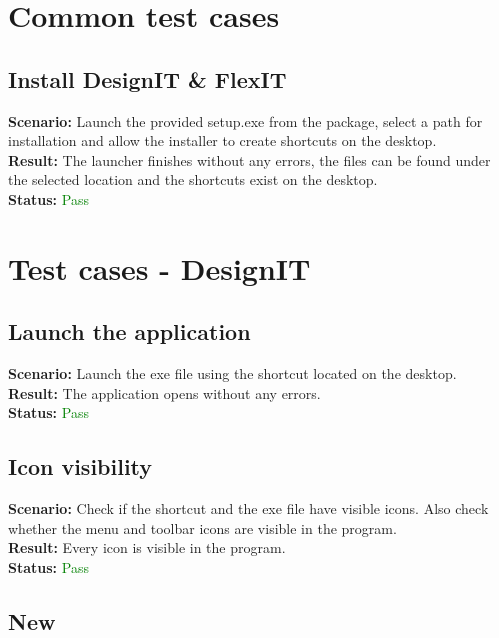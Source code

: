 \documentclass[a4paper, 11pt, article]{report}
\begin{document}
\section{Common test cases}

\subsection{Install DesignIT \& FlexIT}

\noindent \textbf{Scenario:} Launch the provided setup.exe from the package, select a path for installation and allow the installer to create shortcuts on the desktop.
\\
\noindent \textbf{Result:} The launcher finishes without any errors, the files can be found under the selected location and the shortcuts exist on the desktop.
\\
\noindent \textbf{Status:} \textcolor{green}{Pass}

\section{Test cases - DesignIT}

\subsection{Launch the application}

\noindent \textbf{Scenario:} Launch the exe file using the shortcut located on the desktop.
\\
\noindent \textbf{Result:} The application opens without any errors.
\\
\noindent \textbf{Status:} \textcolor{green}{Pass}

\subsection{Icon visibility}

\noindent \textbf{Scenario:} Check if the shortcut and the exe file have visible icons. Also check whether the menu and toolbar icons are visible in the program.
\\
\noindent \textbf{Result:} Every icon is visible in the program.
\\
\noindent \textbf{Status:} \textcolor{green}{Pass}

\subsection{New}
\end{document}

